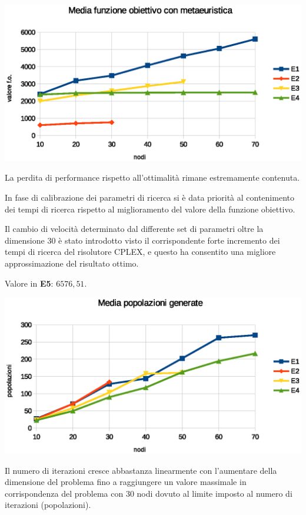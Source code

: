\documentclass[a4paper]{article}
\begin{document}
                    \includegraphics[scale=0.7]{img/gavgobj}

                    La perdita di performance rispetto all'ottimalit\`a rimane estremamente contenuta.

                    In fase di calibrazione dei parametri di ricerca si \`e data priorit\`a al contenimento dei tempi di ricerca rispetto al miglioramento del valore della funzione obiettivo.

                    Il cambio di velocit\`a determinato dal differente set di parametri oltre la dimensione 30 \`e stato introdotto visto il corrispondente forte incremento dei tempi di ricerca del
                    risolutore CPLEX, e questo ha consentito una migliore approssimazione del risultato ottimo.

                    Valore in \textbf{E5}: $6576,51$.

                    \includegraphics[scale=0.7]{img/popavg}

                    Il numero di iterazioni cresce abbastanza linearmente con l'aumentare della dimensione del problema fino a raggiungere un valore massimale in corrispondenza del problema con 30 nodi
                    dovuto al limite imposto al numero di iterazioni (popolazioni).
\end{document}
